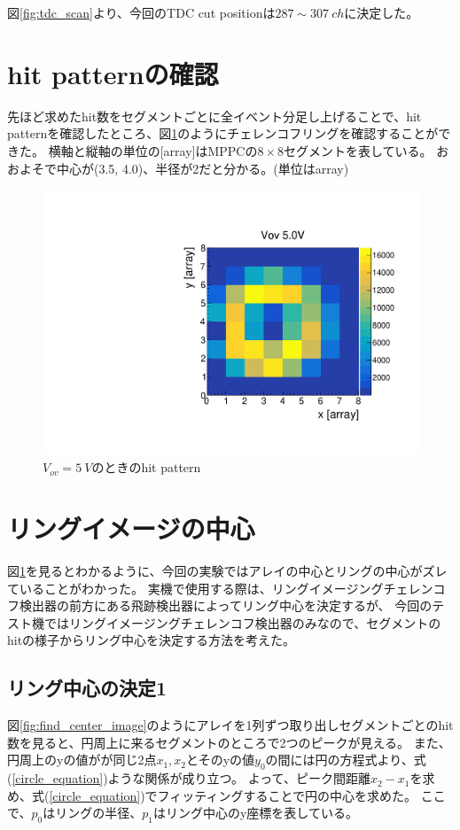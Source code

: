 \documentclass[uplatex, titlepage, dvipdfmx, 12pt, a4paper]{jsreport}
\begin{document}
  図\ref{fig:tdc_scan}より、今回のTDC cut positionは$287 \sim 307 \:\si{ch}$に決定した。
    
  \section{hit patternの確認}
    先ほど求めたhit数をセグメントごとに全イベント分足し上げることで、hit patternを確認したところ、図\ref{fig:hitpattern}のようにチェレンコフリングを確認することができた。
    横軸と縦軸の単位の[array]はMPPCの$8\times 8$セグメントを表している。
    おおよそで中心が(3.5, 4.0)、半径が2だと分かる。(単位はarray)
    \begin{figure}[hbtp]
      \begin{center} 
        \includegraphics[scale=0.5, clip]{image/hitpattern.pdf}
        \caption{$V_{ov}=\SI{5}{V}$のときのhit pattern} 
        \label{fig:hitpattern} 
      \end{center}
    \end{figure}

  \section{リングイメージの中心}
    図\ref{fig:hitpattern}を見るとわかるように、今回の実験ではアレイの中心とリングの中心がズレていることがわかった。
    実機で使用する際は、リングイメージングチェレンコフ検出器の前方にある飛跡検出器によってリング中心を決定するが、
    今回のテスト機ではリングイメージングチェレンコフ検出器のみなので、セグメントのhitの様子からリング中心を決定する方法を考えた。
    \subsection{リング中心の決定1}
      図\ref{fig:find_center_image}のようにアレイを1列ずつ取り出しセグメントごとのhit数を見ると、円周上に来るセグメントのところで2つのピークが見える。
      また、円周上のyの値がが同じ2点$x_1,x_2$とそのyの値$y_0$の間には円の方程式より、式(\ref{circle_equation})ような関係が成り立つ。
      よって、ピーク間距離$x_2-x_1$を求め、式(\ref{circle_equation})でフィッティングすることで円の中心を求めた。
      ここで、$p_0$はリングの半径、$p_1$はリング中心のy座標を表している。
      
\end{document}
